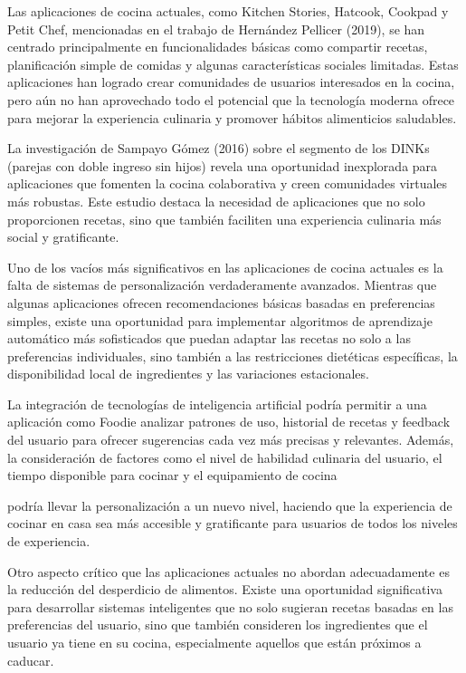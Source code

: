 \documentclass[a4paper,12pt]{article}
\begin{document}
Las aplicaciones de cocina actuales, como Kitchen Stories, Hatcook, Cookpad y Petit Chef, mencionadas en el trabajo de Hernández Pellicer (2019), se han centrado principalmente en funcionalidades básicas como compartir recetas, planificación simple de comidas y algunas características sociales limitadas. Estas aplicaciones han logrado crear comunidades de usuarios interesados en la cocina, pero aún no han aprovechado todo el potencial que la tecnología moderna ofrece para mejorar la experiencia culinaria y promover hábitos alimenticios saludables.

La investigación de Sampayo Gómez (2016) sobre el segmento de los DINKs (parejas con doble ingreso sin hijos) revela una oportunidad inexplorada para aplicaciones que fomenten la cocina colaborativa y creen comunidades virtuales más robustas. Este estudio destaca la necesidad de aplicaciones que no solo proporcionen recetas, sino que también faciliten una experiencia culinaria más social y gratificante.

Uno de los vacíos más significativos en las aplicaciones de cocina actuales es la falta de sistemas de personalización verdaderamente avanzados. Mientras que algunas aplicaciones ofrecen recomendaciones básicas basadas en preferencias simples, existe una oportunidad para implementar algoritmos de aprendizaje automático más sofisticados que puedan adaptar las recetas no solo a las preferencias individuales, sino también a las restricciones dietéticas específicas, la disponibilidad local de ingredientes y las variaciones estacionales.

La integración de tecnologías de inteligencia artificial podría permitir a una aplicación como Foodie analizar patrones de uso, historial de recetas y feedback del usuario para ofrecer sugerencias cada vez más precisas y relevantes. Además, la consideración de factores como el nivel de habilidad culinaria del usuario, el tiempo disponible para cocinar y el equipamiento de cocina
 
podría llevar la personalización a un nuevo nivel, haciendo que la experiencia de cocinar en casa sea más accesible y gratificante para usuarios de todos los niveles de experiencia.

Otro aspecto crítico que las aplicaciones actuales no abordan adecuadamente es la reducción del desperdicio de alimentos. Existe una oportunidad significativa para desarrollar sistemas inteligentes que no solo sugieran recetas basadas en las preferencias del usuario, sino que también consideren los ingredientes que el usuario ya tiene en su cocina, especialmente aquellos que están próximos a caducar.
\end{document}
